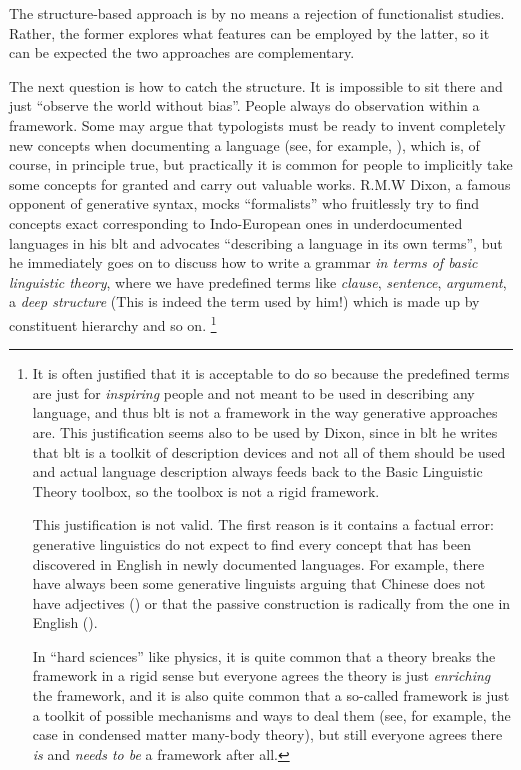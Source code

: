 \documentclass[../main.tex]{subfiles}
\begin{document}
The structure-based approach is by no means a rejection of functionalist studies. Rather, the former explores 
what features can be employed by the latter, so it can be expected the two approaches are complementary.

The next question is how to catch the structure. It is impossible to sit there and just ``observe the world without bias''. People always do observation within a 
framework. Some may argue that typologists must be ready to invent completely new concepts when documenting 
a language (see, for example, \citet{haspelmath2008framework}), which is, of course, in principle true, 
but practically it is common for people to implicitly take some concepts for granted and carry out 
valuable works. 
R.M.W Dixon, a famous opponent of generative syntax, mocks ``formalists'' 
who fruitlessly try to find concepts exact corresponding to Indo-European ones in underdocumented languages 
in his \ac{blt} \citep{dixon2009basic} and advocates ``describing a language in its own terms'',
but he immediately goes on to discuss how to write a grammar \emph{in terms of basic linguistic theory},
where we have predefined terms like \emph{clause}, \emph{sentence}, \emph{argument}, a \emph{deep structure}
(This is indeed the term used by him!) which is made up by constituent hierarchy and so on.%
\footnote{
    It is often justified that it is acceptable to do so 
    because the predefined terms are just for \emph{inspiring} people 
    and not meant to be used in describing any language, 
    and thus \ac{blt} is not a framework in the way generative approaches are. 
    This justification seems also to be used by Dixon, since in \ac{blt} he writes 
    that \ac{blt} is a toolkit of description devices 
    and not all of them should be used 
    and actual language description always feeds back to the Basic Linguistic Theory toolbox, 
    so the toolbox is not a rigid framework.
    
    This justification is not valid.
    The first reason is it contains a factual error: 
    generative linguistics do not expect to find every concept 
    that has been discovered in English in newly documented languages.
    For example, there have always been some generative linguists arguing 
    that Chinese does not have adjectives ()
    or that the passive construction is radically from the one in English 
    ().
    
    In ``hard sciences'' like physics, it is quite common 
    that a theory breaks the framework in a rigid sense 
    but everyone agrees the theory is just \emph{enriching} the framework, 
    and it is also quite common that 
    a so-called framework is just a toolkit of possible mechanisms and ways to deal them
    (see, for example, the case in condensed matter many-body theory), 
    but still everyone agrees there \emph{is} and \emph{needs to be} a framework after all. 
}
\end{document}
